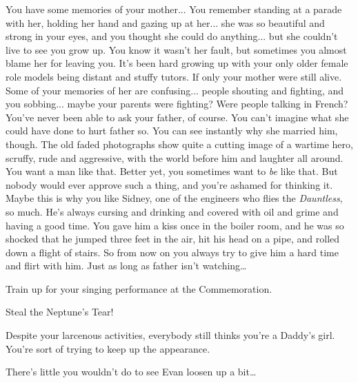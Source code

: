 \documentclass[char]{airship}
\begin{document}
You have some memories of your mother... You remember standing at a
parade with her, holding her hand and gazing up at her... she was so
beautiful and strong in your eyes, and you thought she could do
anything... but she couldn't live to see you grow up. You know it
wasn't her fault, but sometimes you almost blame her for leaving
you. It's been hard growing up with your only older female role models
being distant and stuffy tutors. If only your mother were still
alive. Some of your memories of her are confusing... people shouting
and fighting, and you sobbing... maybe your parents were fighting?
Were people talking in French?  You've never been able to ask your
father, of course. You can't imagine what she could have done to hurt
father so. You can see instantly why she married him, though. The old
faded photographs show quite a cutting image of a wartime hero,
scruffy, rude and aggressive, with the world before him and laughter
all around. You want a man like that. Better yet, you sometimes want
to {\it be} like that. But nobody would ever approve such a thing, and
you're ashamed for thinking it. Maybe this is why you like Sidney, one
of the engineers who flies the {\it Dauntless}, so much. He's always
cursing and drinking and covered with oil and grime and having a good
time. You gave him a kiss once in the boiler room, and he was so
shocked that he jumped three feet in the air, hit his head on a pipe,
and rolled down a flight of stairs. So from now on you always try to
give him a hard time and flirt with him. Just as long as father isn't
watching{\ldots}


\begin{itemz}[Goals]
  \item Train up for your singing performance at the Commemoration.
  \item Steal the Neptune's Tear!
\end{itemz}

\begin{itemz}[Notes]
  \item Despite your larcenous activities, everybody still thinks you're a Daddy's girl. You're sort of trying to keep up the appearance.
  \item There's little you wouldn't do to see Evan loosen up a bit{\ldots}
\end{itemz}
\end{document}
